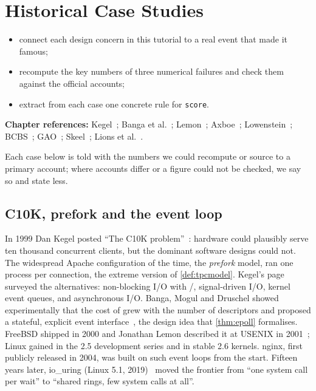 \chapter{Historical Case Studies}\label{ch:history}

\begin{objectives}
\begin{itemize}
\item connect each design concern in this tutorial to a real event that made it famous;
\item recompute the key numbers of three numerical failures and check them against the official accounts;
\item extract from each case one concrete rule for \texttt{score}.
\end{itemize}
{\small\color{muted}\textbf{Chapter references:} Kegel~\cite{kegel1999c10k}; Banga et al.~\cite{banga1999scalable}; Lemon~\cite{lemon2001kqueue}; Axboe~\cite{axboe2019iouring}; Lowenstein~\cite{lowenstein2000genius}; BCBS~\cite{bcbs2009revisions,bcbs2019frtb}; GAO~\cite{gao1992patriot}; Skeel~\cite{skeel1992roundoff}; Lions et al.~\cite{lions1996ariane}.}
\end{objectives}

Each case below is told with the numbers we could recompute or source to a primary account; where accounts differ or a
figure could not be checked, we say so and state less.

\section{C10K, prefork and the event loop}\label{sec:hist-c10k}
In 1999 Dan Kegel posted ``The C10K problem''~\cite{kegel1999c10k}: hardware could plausibly serve ten thousand
concurrent clients, but the dominant software designs could not. The widespread Apache configuration of the time, the
\emph{prefork} model, ran one process per connection, the extreme version of \cref{def:tpcmodel}. Kegel's page surveyed the
alternatives: non-blocking I/O with /, signal-driven I/O, kernel event queues, and asynchronous I/O.
Banga, Mogul and Druschel showed experimentally that the cost of  grew with the number of descriptors and
proposed a stateful, explicit event interface~\cite{banga1999scalable}, the design idea that \cref{thm:epoll} formalises.
FreeBSD shipped  in 2000 and Jonathan Lemon described it at USENIX in 2001~\cite{lemon2001kqueue}; Linux gained
 in the 2.5 development series and in stable 2.6 kernels. nginx, first publicly released in 2004, was built on
such event loops from the start. Fifteen years later, io\_uring (Linux 5.1, 2019)~\cite{axboe2019iouring} moved the frontier
from ``one system call per wait'' to ``shared rings, few system calls at all''.

